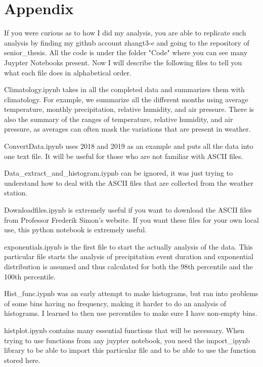\documentclass[11pt]{report}
\begin{document}
\renewcommand{\bibname}{References}



\clearpage

	\section{Appendix} 
	If you were curious as to how I did my analysis, you are able to replicate such analysis by finding my github account zhangt3-e and going to the repository of senior\_thesis. All the code is under the folder "Code" where you can see many Juypter Notebooks present. Now I will describe the following files to tell you what each file does in alphabetical order. 
	
	Climatology.ipynb takes in all the completed data and summarizes them with climatology. For example, we summarize all the different months using average temperature, monthly precipitation, relative humidity, and air pressure. There is also the summary of the ranges of temperature, relative humidity, and air pressure, as averages can often mask the variations that are present in weather. 
	
	ConvertData.ipynb uses 2018 and 2019 as an example and puts all the data into one text file. It will be useful for those who are not familiar with ASCII files. 
	
	Data\_extract\_and\_histogram.iypnb can be ignored, it was just trying to understand how to deal with the ASCII files that are collected from the weather station. 
	
	Downloadfiles.ipynb is extremely useful if you want to download the ASCII files from Professor Frederik Simon's website. If you want these files for your own local use, this python notebook is extremely useful. 
	
	exponentials.ipynb is the first file to start the actually analysis of the data. This particular file starts the analysis of precipitation event duration and exponential distribution is assumed and thus calculated for both the 98th percentile and the 100th percentile. 
	
	Hist\_func.iypnb was an early attempt to make histograms, but ran into problems of some bins having no frequency, making it harder to do an analysis of histograms. I learned to then use percentiles to make sure I have non-empty bins.
	
	histplot.ipynb contains many essential functions that will be necessary. When trying to use functions from any juypter notebook, you need the import\_ipynb library to be able to import this particular file and to be able to use the function stored here. 
	
\end{document}
